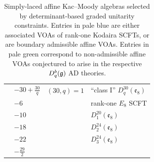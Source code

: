 \begin{table}[]
\begin{tabularx}{\textwidth}{
|>{\centering\arraybackslash}p{}
|>{\raggedright\arraybackslash}p{}
|>{\raggedright\arraybackslash}p{}
|X|
}
\multirow{6}{*}{$V_k(\mathfrak e_8)$} & \cellcolor{knownSCFT}$-30+\frac{30}{q}$ & \cellcolor{knownSCFT}$(30,q)=1$ & \cellcolor{knownSCFT}``class I'' $D_q^{30}(\mathfrak e_8)$ \\
\hhline{~---}

& \cellcolor{knownSCFT}$-6$ & \cellcolor{knownSCFT} & \cellcolor{knownSCFT}rank-one $E_8$ SCFT \\
\hhline{~---}

& \cellcolor{newSCFT} $-10$ & \cellcolor{newSCFT} & \cellcolor{newSCFT} \qquad $D_1^{20}(\mathfrak e_8)$ \\
\hhline{~---}

& \cellcolor{newSCFT} $-18$ & \cellcolor{newSCFT} & \cellcolor{newSCFT} \qquad $D_2^{24}(\mathfrak e_8)$ \\
\hhline{~---}

& \cellcolor{newSCFT} $-22$ & \cellcolor{newSCFT} & \cellcolor{newSCFT} \qquad $D_3^{24}(\mathfrak e_8)$ \\
\hhline{~---}

& $-\frac{29}{2}$ & & \\
\hline

\end{tabularx}

\caption{Simply-laced affine Kac--Moody algebras selected by determinant-based graded unitarity constraints. Entries in pale blue are either associated VOAs of rank-one Kodaira SCFTs, or are boundary admissible affine VOAs. Entries in pale green correspond to non-admissible affine VOAs conjectured to arise in the respective $D^b_q(\mathfrak{g})$ AD theories.}
\label{tab:classification}

\end{table}
